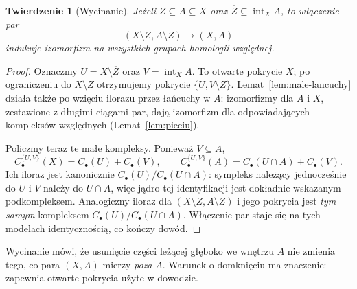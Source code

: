 \documentclass[11pt,a4paper,oneside]{report}
\theoremstyle{plain}
\newtheorem{twierdzenie}{Twierdzenie}[section]
\theoremstyle{definition}
\theoremstyle{remark}
\begin{document}
\begin{twierdzenie}[Wycinanie]
\label{thm:wycinanie}
Jeżeli $Z\subseteq A\subseteq X$ oraz
$\overline Z\subseteq\operatorname{int}_X A$,
to włączenie par
\[
 (X\setminus Z,A\setminus Z)\longrightarrow(X,A)
\]
indukuje izomorfizm na wszystkich
grupach homologii względnej.
\end{twierdzenie}
\begin{proof}
Oznaczmy $U=X\setminus\overline Z$
oraz $V=\operatorname{int}_X A$.
To otwarte pokrycie $X$;
po ograniczeniu do $X\setminus Z$
otrzymujemy pokrycie
$\{U,V\setminus Z\}$.
Lemat~\ref{lem:male-lancuchy} działa
także po wzięciu ilorazu przez
łańcuchy w $A$: izomorfizmy
dla $A$ i $X$, zestawione
z długimi ciągami par, dają
izomorfizm dla odpowiadających
kompleksów względnych
(Lemat~\ref{lem:pieciu}).

Policzmy teraz te małe kompleksy.
Ponieważ $V\subseteq A$,
\[
 C_\bullet^{\{U,V\}}(X)
   =C_\bullet(U)+C_\bullet(V),\qquad
 C_\bullet^{\{U,V\}}(A)
   =C_\bullet(U\cap A)+C_\bullet(V).
\]
Ich iloraz jest kanonicznie
$C_\bullet(U)/C_\bullet(U\cap A)$:
sympleks należący jednocześnie do
$U$ i $V$ należy do $U\cap A$,
więc jądro tej identyfikacji jest
dokładnie wskazanym podkompleksem.
Analogiczny iloraz dla
$(X\setminus Z,A\setminus Z)$
i jego pokrycia jest \emph{tym samym}
kompleksem
$C_\bullet(U)/C_\bullet(U\cap A)$.
Włączenie par staje się na tych
modelach identycznością, co
kończy dowód.
\end{proof}

Wycinanie mówi, że usunięcie części
leżącej głęboko we wnętrzu $A$
nie zmienia tego, co para $(X,A)$
mierzy \emph{poza} $A$. Warunek
o domknięciu ma znaczenie:
zapewnia otwarte pokrycia użyte
w dowodzie.
\end{document}
